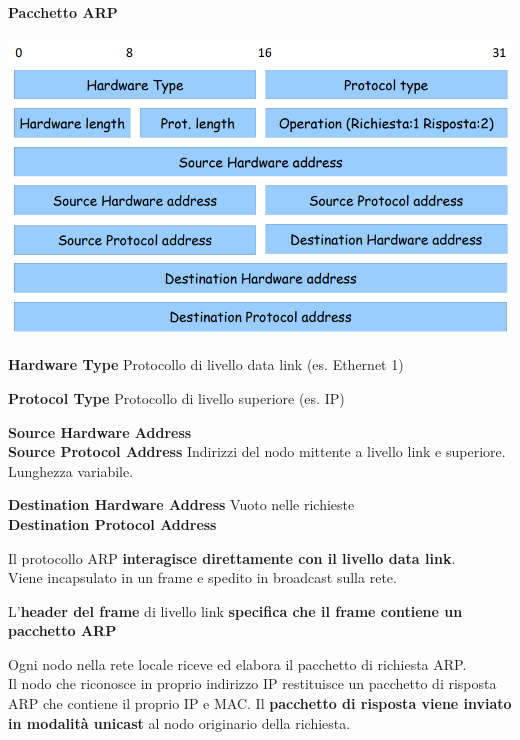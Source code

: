 \documentclass[10pt]{article}
\begin{document}
\paragraph{Pacchetto ARP}
\begin{center}
\includegraphics[scale=0.7]{arppkt.png}
\end{center}
\begin{list}{}{}
	\item \textbf{Hardware Type} Protocollo di livello data link (es. Ethernet 1)
	\item \textbf{Protocol Type} Protocollo di livello superiore (es. IP)
	\item \textbf{Source Hardware Address}\\
	\textbf{Source Protocol Address} Indirizzi del nodo mittente a livello link e superiore. Lunghezza variabile.
	\item \textbf{Destination Hardware Address} Vuoto nelle richieste\\
	\textbf{Destination Protocol Address}
\end{list}
\begin{list}{}{\textbf{Caratteristiche}}
	\item Il protocollo ARP \textbf{interagisce direttamente con il livello data link}.\\
	Viene incapsulato in un frame e spedito in broadcast sulla rete.
	\item L'\textbf{header del frame} di livello link \textbf{specifica che il frame contiene un pacchetto ARP}
	\item Ogni nodo nella rete locale riceve ed elabora il pacchetto di richiesta ARP.\\
	Il nodo che riconosce in proprio indirizzo IP restituisce un pacchetto di risposta ARP che contiene il proprio IP e MAC. Il \textbf{pacchetto di risposta viene inviato in modalità unicast} al nodo originario della richiesta.
\end{list}
\end{document}

